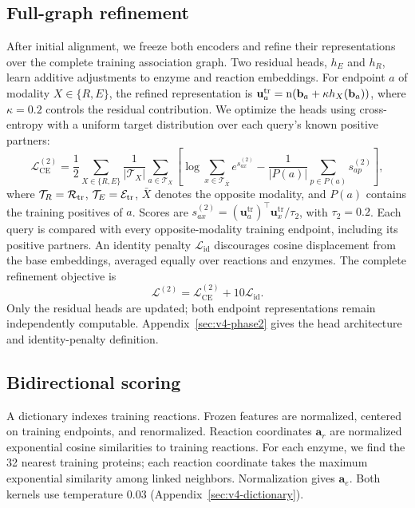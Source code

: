 \subsection{Full-graph refinement}
\label{sec:paper-v4-phase2}
After initial alignment, we freeze both encoders and refine their
representations over the complete training association graph.
Two residual heads, $h_E$ and $h_R$, learn additive adjustments to enzyme
and reaction embeddings. For endpoint $a$ of modality $X\in\{R,E\}$,
the refined representation is
$\mathbf{u}_a^{\mathrm{tr}}=\operatorname{n}(\mathbf{b}_a+\kappa h_X(\mathbf{b}_a))$,
where $\kappa=0.2$ controls the residual contribution.
We optimize the heads using cross-entropy with a uniform target
distribution over each query's known positive partners:
\begin{equation}
 \mathcal L_{\mathrm{CE}}^{(2)}=
 \frac12\sum_{X\in\{R,E\}}\frac{1}{|\mathcal T_X|}\sum_{a\in\mathcal T_X}
 \left[\log\sum_{x\in\mathcal T_{\bar X}}e^{s_{ax}^{(2)}}
       -\frac{1}{|P(a)|}\sum_{p\in P(a)}s_{ap}^{(2)}\right],
 \label{eq:paper-phase2-ce}
\end{equation}
where $\mathcal T_R=\mathcal{R}_{\mathrm{tr}}$, $\mathcal T_E=\mathcal{E}_{\mathrm{tr}}$, $\bar X$ denotes the opposite
modality, and $P(a)$ contains the training positives of $a$.
Scores are $s_{ax}^{(2)}=(\mathbf{u}_a^{\mathrm{tr}})^\top
\mathbf{u}_x^{\mathrm{tr}}/\tau_2$, with $\tau_2=0.2$.
Each query is compared with every opposite-modality training endpoint,
including its positive partners. An identity penalty $\mathcal L_{\mathrm{id}}$
discourages cosine displacement from the base embeddings, averaged equally
over reactions and enzymes. The complete refinement objective is
\begin{equation}
 \mathcal L^{(2)}=\mathcal L_{\mathrm{CE}}^{(2)}+10\mathcal L_{\mathrm{id}}.
 \label{eq:paper-phase2-total}
\end{equation}
Only the residual heads are updated; both endpoint representations remain
independently computable. Appendix~\ref{sec:v4-phase2} gives the head
architecture and identity-penalty definition.

\subsection{Bidirectional scoring}
\label{sec:paper-v4-retrieval}
A dictionary indexes training reactions. Frozen features are normalized,
centered on training endpoints, and renormalized. Reaction coordinates
$\mathbf{a}_r$ are normalized exponential cosine similarities to training reactions.
For each enzyme, we find the 32 nearest training proteins; each reaction
coordinate takes the maximum exponential similarity among linked neighbors.
Normalization gives $\mathbf{a}_e$.
Both kernels use temperature 0.03 (Appendix~\ref{sec:v4-dictionary}).

